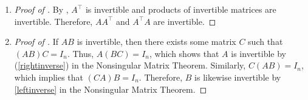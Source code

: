 \begin{enumerate}[!HW!, start=1]

\item \begin{proof}[Proof of ] By , $A^\top $ is invertible and products of invertible matrices are invertible. Therefore, $AA^\top $ and $A^\top A$ are invertible.
\end{proof}

\item \begin{proof}[Proof of ]
If $AB$ is invertible, then there exists some matrix $C$ such that $(AB)C = I_n$. Thus, $A(BC) = I_n$, which shows that $A$ is invertible by (\ref{rightinverse}) in the Nonsingular Matrix Theorem. Similarly, $C(AB) = I_n$, which implies that $(CA)B = I_n$. Therefore, $B$ is likewise invertible by \ref{leftinverse} in the Nonsingular Matrix Theorem.
\end{proof}
\end{enumerate}

\vspace{-15 pt}